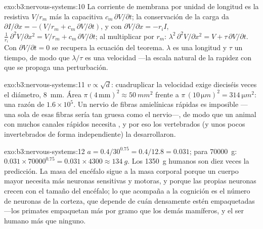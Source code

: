 \begin{solution}{exo:b3:nervous-systems:10}
La corriente de membrana por unidad de longitud es la resistiva
$V/r_{m}$ más la capacitiva $c_{m}\,\partial V/\partial t$; la
conservación de la carga da
$\partial I/\partial x = -(V/r_{m} + c_{m}\,\partial V/\partial t)$, y
con $\partial V/\partial x = -r_{i}I$, $\frac{1}{r_{i}}\,\partial^{2}V/
\partial x^{2} = V/r_{m} + c_{m}\,\partial V/\partial t$; al multiplicar
por $r_{m}$: $\lambda^{2}\,\partial^{2}V/\partial x^{2} = V + \tau\,\partial
V/\partial t$. Con $\partial V/\partial t = 0$ se recupera la ecuación
del teorema. $\lambda$ es una longitud y $\tau$ un tiempo, de modo que
$\lambda/\tau$ es una velocidad ---la escala natural de la rapidez con
que se propaga una perturbación.
\end{solution}

\begin{solution}{exo:b3:nervous-systems:11}
$v \propto \sqrt{d}$: cuadruplicar la velocidad exige dieciséis veces el
diámetro, \qty{8}{mm}. Área $\pi(4\,\text{mm})^{2} \approx \qty{50}{mm^2}$
frente a $\pi\,(10\,\unit{\micro m})^{2} = \qty{314}{\micro m^2}$: una razón de
$1.6\times 10^{5}$. Un nervio de fibras amielínicas rápidas es
imposible ---una sola de esas fibras sería tan gruesa como el nervio---,
de modo que un animal con muchos canales rápidos necesita , y
por eso los vertebrados (y unos pocos invertebrados de forma
independiente) la desarrollaron.
\end{solution}

\begin{solution}{exo:b3:nervous-systems:12}
$a = 0.4/30^{0.75} = 0.4/12.8 = 0.031$; para \qty{70000}{g}: $0.031\times
\num{70000}^{0.75} = 0.031\times 4300 \approx \qty{134}{g}$. Los
\qty{1350}{g} humanos son diez veces la predicción. La masa del
encéfalo sigue a la masa corporal porque un cuerpo mayor necesita más
neuronas sensitivas y motoras, y porque las propias neuronas crecen con
el tamaño del encéfalo; lo que acompaña a la cognición es el número de
neuronas de la corteza, que depende de cuán densamente estén
empaquetadas ---los primates empaquetan más por gramo que los demás
mamíferos, y el ser humano más que ninguno.
\end{solution}

